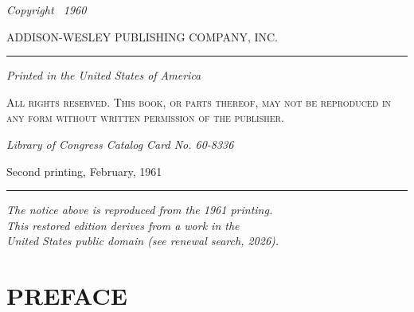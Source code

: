 \documentclass[11pt]{book}
\theoremstyle{bkplain}
\theoremstyle{XIplainnote}
\theoremstyle{bkplain}
\theoremstyle{bkplain}
\begin{document}
\thispagestyle{empty}
\null\vspace*{0.22\textheight}
\begin{center}
  {\itshape Copyright \textcopyright\ 1960}\par
  {\normalsize ADDISON-WESLEY PUBLISHING COMPANY, INC.}\par
  \rule{0.30\linewidth}{0.4pt}\par
  {\itshape Printed in the United States of America}\par
  \vspace{1.1em}
  {\footnotesize\textsc{All rights reserved. This book, or parts thereof,
   may not be reproduced in any form without written permission of the
   publisher.}}\par
  \vspace{0.9em}
  {\itshape Library of Congress Catalog Card No. 60-8336}\par
  \vspace{1.4em}
  {\normalsize Second printing, February, 1961}
  \vspace{2.6em}

  \rule{0.30\linewidth}{0.4pt}\par
  \vspace{0.9em}
  {\footnotesize\itshape The notice above is reproduced from the 1961
   printing.\\ This restored edition derives from a work in the\\
   United States public domain (see renewal search, 2026).}
\end{center}
\vfill
\clearpage

\tableofcontents

\chapter*{\centering\Large PREFACE}
\end{document}
